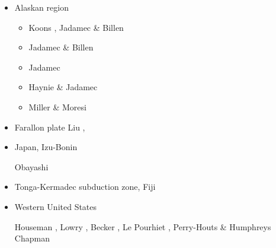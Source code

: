 \begin{itemize}
\item{Alaskan region} 

\begin{scriptsize}
\begin{itemize}
\item[\twothousandten] Koons \etal \cite{kohp10}, Jadamec \& Billen \cite{jabi10a}
\item[\twothousandtwelve] Jadamec \& Billen \cite{jabi12}
\item[\twothousandthirteen] Jadamec \etal \cite{jabr13}
\item[\twothousandseventeen] Haynie \& Jadamec \cite{haja17}
\item[\twothousandeighteen] Miller \& Moresi \cite{mimo18}
\end{itemize}
\end{scriptsize}

\item{Farallon plate} 
{\scriptsize
Liu \etal \cite{lisg08},
\cite{list11}
\cite{list12}
\cite{licu16}
}
\item{Japan, Izu-Bonin} 

\begin{scriptsize}
\cite{hond85}
\cite{lohd07}
Obayashi \etal \cite{obyf09}\\
\cite{vakn12}
\cite{musi13}
\cite{kigk14}\cite{leli14}\cite{mova14}\cite{hond14}
\cite{kilk15}
\cite{yagz17}
\cite{yamg19}
\cite{mapg20}
\end{scriptsize}

\item{Tonga-Kermadec subduction zone, Fiji} 

\begin{scriptsize}
\cite{bigs03}\cite{bigu03}
\cite{zhpy06}
\cite{ligl21}
\end{scriptsize}

\item{Western United States}


\begin{scriptsize}
Houseman \etal \cite{honk00}, Lowry \etal \cite{lors00},
Becker \etal \cite{besb06}, Le Pourhiet \etal \cite{legs06},
Perry-Houts \& Humphreys \cite{pehu18}
Chapman \cite{chap21}
\end{scriptsize}



\end{itemize}
